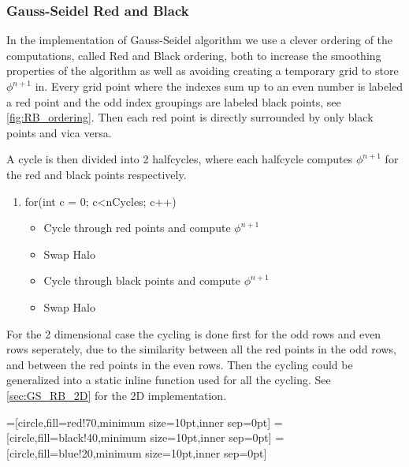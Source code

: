 		\subsubsection{Gauss-Seidel Red and Black}
		In the implementation of Gauss-Seidel algorithm we use a clever ordering of the computations,
		called Red and Black ordering, both to increase the smoothing properties of the algorithm as well as avoiding
 		creating a temporary grid to store \(\phi^{n+1}\) in. Every grid point where the indexes sum up to an even number
		is labeled a red point and the odd index groupings are labeled black points, see \cref{fig:RB_ordering}. Then
		each red point is directly surrounded by only black points and vica versa.

		A cycle is then divided into 2 halfcycles, where each halfcycle computes \(\phi^{n+1}\) for the red and black points respectively.

		\begin{enumerate}
			\item for(int c = 0; c<nCycles; c++)
				\begin{itemize}
					\item Cycle through red points and compute \(\phi^{n+1}\)
					\item Swap Halo
					\item Cycle through black points and compute \(\phi^{n+1}\)
					\item Swap Halo
				\end{itemize}
		\end{enumerate}

		For the 2 dimensional case the cycling is done first for the odd rows and even rows seperately, due
		to the similarity between all the red points in the odd rows, and between the red points in the even rows.
		Then the cycling could be generalized into a static inline function used for all the cycling. See \ref{sec:GS_RB_2D} for the 2D implementation.



		=[circle,fill=red!70,minimum size=10pt,inner sep=0pt]
		=[circle,fill=black!40,minimum size=10pt,inner sep=0pt]
		=[circle,fill=blue!20,minimum size=10pt,inner sep=0pt]


